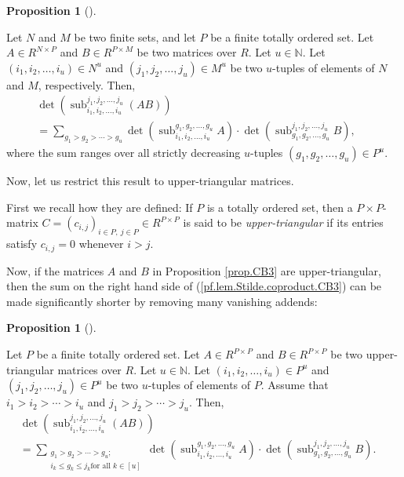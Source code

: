 \documentclass[numbers=enddot,12pt,final,onecolumn,notitlepage]{scrartcl}%
\numberwithin{exer}{section}
\theoremstyle{definition}
\newtheorem{prop}[theo]{Proposition}
\newenvironment{proposition}[1][]
{\begin{prop}[#1]\begin{leftbar}}
{\end{leftbar}\end{prop}}
\let\sumnonlimits\sum
\renewcommand{\sum}{\sumnonlimits\limits}
\theoremstyle{plainsl}
\begin{document}
\begin{proposition}
\label{prop.CB3}Let $N$ and $M$ be two finite sets, and let $P$ be a finite
totally ordered set. Let $A\in R^{N\times P}$ and $B\in R^{P\times M}$ be two
matrices over $R$. Let $u\in\mathbb{N}$. Let $\left(  i_{1},i_{2},\ldots
,i_{u}\right)  \in N^{u}$ and $\left(  j_{1},j_{2},\ldots,j_{u}\right)  \in
M^{u}$ be two $u$-tuples of elements of $N$ and $M$, respectively. Then,%
\begin{align}
&  \det\left(  \operatorname*{sub}\nolimits_{i_{1},i_{2},\ldots,i_{u}}%
^{j_{1},j_{2},\ldots,j_{u}}\left(  AB\right)  \right) \nonumber\\
&  =\sum_{g_{1}>g_{2}>\cdots>g_{u}}\det\left(  \operatorname*{sub}%
\nolimits_{i_{1},i_{2},\ldots,i_{u}}^{g_{1},g_{2},\ldots,g_{u}}A\right)
\cdot\det\left(  \operatorname*{sub}\nolimits_{g_{1},g_{2},\ldots,g_{u}%
}^{j_{1},j_{2},\ldots,j_{u}}B\right)
,\ \ \ \ \ \ \ \ \ \ \label{pf.lem.Stilde.coproduct.CB3}%
\end{align}
where the sum ranges over all strictly decreasing $u$-tuples $\left(
g_{1},g_{2},\ldots,g_{u}\right)  \in P^{u}$.
\end{proposition}

Now, let us restrict this result to upper-triangular matrices.

First we recall how they are defined: If $P$ is a totally ordered set, then a
$P\times P$-matrix $C=\left(  c_{i,j}\right)  _{i\in P,\ j\in P}\in R^{P\times
P}$ is said to be \emph{upper-triangular} if its entries satisfy $c_{i,j}=0$
whenever $i>j$.

Now, if the matrices $A$ and $B$ in Proposition \ref{prop.CB3} are
upper-triangular, then the sum on the right hand side of
(\ref{pf.lem.Stilde.coproduct.CB3}) can be made significantly shorter by
removing many vanishing addends:

\begin{proposition}
\label{prop.CB4}Let $P$ be a finite totally ordered set. Let $A\in R^{P\times
P}$ and $B\in R^{P\times P}$ be two upper-triangular matrices over $R$. Let
$u\in\mathbb{N}$. Let $\left(  i_{1},i_{2},\ldots,i_{u}\right)  \in P^{u}$ and
$\left(  j_{1},j_{2},\ldots,j_{u}\right)  \in P^{u}$ be two $u$-tuples of
elements of $P$. Assume that $i_{1}>i_{2}>\cdots>i_{u}$ and $j_{1}%
>j_{2}>\cdots>j_{u}$. Then,%
\begin{align}
&  \det\left(  \operatorname*{sub}\nolimits_{i_{1},i_{2},\ldots,i_{u}}%
^{j_{1},j_{2},\ldots,j_{u}}\left(  AB\right)  \right) \nonumber\\
&  =\sum_{\substack{g_{1}>g_{2}>\cdots>g_{u};\\i_{k}\leq g_{k}\leq j_{k}\text{
for all }k\in\left[  u\right]  }}\det\left(  \operatorname*{sub}%
\nolimits_{i_{1},i_{2},\ldots,i_{u}}^{g_{1},g_{2},\ldots,g_{u}}A\right)
\cdot\det\left(  \operatorname*{sub}\nolimits_{g_{1},g_{2},\ldots,g_{u}%
}^{j_{1},j_{2},\ldots,j_{u}}B\right)
.\ \ \ \ \ \ \ \ \ \ \label{pf.lem.Stilde.coproduct.CB4}%
\end{align}

\end{proposition}
\end{document}
